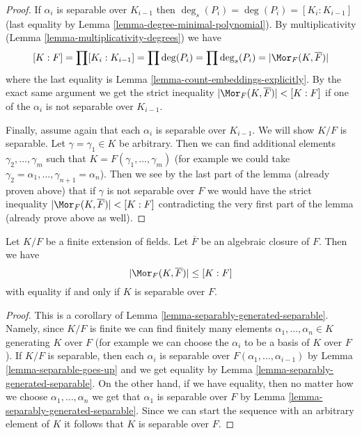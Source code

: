 \begin{proof}
If $\alpha_i$ is separable over $K_{i - 1}$ then
$\deg_s(P_i) = \deg(P_i) = [K_i : K_{i - 1}]$
(last equality by Lemma \ref{lemma-degree-minimal-polynomial}).
By multiplicativity (Lemma \ref{lemma-multiplicativity-degrees}) we have
$$
[K : F] = \prod [K_i : K_{i - 1}] = \prod \deg(P_i) =
\prod \deg_s(P_i) = |\Mor_F(K, \overline{F})|
$$
where the last equality is Lemma \ref{lemma-count-embeddings-explicitly}.
By the exact same argument we get the strict inequality
$|\Mor_F(K, \overline{F})| < [K : F]$ if one of the $\alpha_i$ is
not separable over $K_{i - 1}$.

\medskip\noindent
Finally, assume again that each $\alpha_i$ is separable over $K_{i - 1}$.
We will show $K/F$ is separable.
Let $\gamma = \gamma_1 \in K$ be arbitrary. Then we can find additional
elements $\gamma_2, \ldots, \gamma_m$ such that
$K = F(\gamma_1, \ldots, \gamma_m)$ (for example we could take
$\gamma_2 = \alpha_1, \ldots, \gamma_{n + 1} = \alpha_n$).
Then we see by the last part of the lemma (already proven above)
that if $\gamma$ is not separable over $F$ we would have the
strict inequality $|\Mor_F(K, \overline{F})| < [K : F]$
contradicting the very first part of the lemma (already prove above
as well).
\end{proof}

\begin{lemma}
\label{lemma-separable-equality}
Let $K/F$ be a finite extension of fields. Let $\overline{F}$ be an
algebraic closure of $F$. Then we have
$$
|\Mor_F(K, \overline{F})| \leq [K : F]
$$
with equality if and only if $K$ is separable over $F$.
\end{lemma}

\begin{proof}
This is a corollary of Lemma \ref{lemma-separably-generated-separable}.
Namely, since $K/F$ is finite we can find finitely many elements
$\alpha_1, \ldots, \alpha_n \in K$ generating $K$ over $F$ (for example
we can choose the $\alpha_i$ to be a basis of $K$ over $F$).
If $K/F$ is separable, then each $\alpha_i$ is separable over
$F(\alpha_1, \ldots, \alpha_{i - 1})$ by Lemma \ref{lemma-separable-goes-up}
and we get equality by Lemma \ref{lemma-separably-generated-separable}.
On the other hand, if we have equality, then no matter how we choose
$\alpha_1, \ldots, \alpha_n$ we get that $\alpha_1$ is separable over
$F$ by Lemma \ref{lemma-separably-generated-separable}. Since we
can start the sequence with an arbitrary element of $K$ it follows
that $K$ is separable over $F$.
\end{proof}


